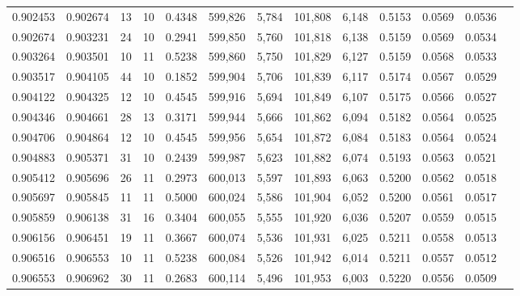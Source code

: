\begin{tabular}{rrrrrrrrrrrrr}
0.902453 & 0.902674 &    13 &  10 &                                     0.4348 & 599,826 &   5,784 & 101,808 &   6,148 & 0.5153 & 0.0569 & 0.0536 \\
0.902674 & 0.903231 &    24 &  10 &                                     0.2941 & 599,850 &   5,760 & 101,818 &   6,138 & 0.5159 & 0.0569 & 0.0534 \\
0.903264 & 0.903501 &    10 &  11 &                                     0.5238 & 599,860 &   5,750 & 101,829 &   6,127 & 0.5159 & 0.0568 & 0.0533 \\
0.903517 & 0.904105 &    44 &  10 &                                     0.1852 & 599,904 &   5,706 & 101,839 &   6,117 & 0.5174 & 0.0567 & 0.0529 \\
0.904122 & 0.904325 &    12 &  10 &                                     0.4545 & 599,916 &   5,694 & 101,849 &   6,107 & 0.5175 & 0.0566 & 0.0527 \\
0.904346 & 0.904661 &    28 &  13 &                                     0.3171 & 599,944 &   5,666 & 101,862 &   6,094 & 0.5182 & 0.0564 & 0.0525 \\
0.904706 & 0.904864 &    12 &  10 &                                     0.4545 & 599,956 &   5,654 & 101,872 &   6,084 & 0.5183 & 0.0564 & 0.0524 \\
0.904883 & 0.905371 &    31 &  10 &                                     0.2439 & 599,987 &   5,623 & 101,882 &   6,074 & 0.5193 & 0.0563 & 0.0521 \\
0.905412 & 0.905696 &    26 &  11 &                                     0.2973 & 600,013 &   5,597 & 101,893 &   6,063 & 0.5200 & 0.0562 & 0.0518 \\
0.905697 & 0.905845 &    11 &  11 &                                     0.5000 & 600,024 &   5,586 & 101,904 &   6,052 & 0.5200 & 0.0561 & 0.0517 \\
0.905859 & 0.906138 &    31 &  16 &                                     0.3404 & 600,055 &   5,555 & 101,920 &   6,036 & 0.5207 & 0.0559 & 0.0515 \\
0.906156 & 0.906451 &    19 &  11 &                                     0.3667 & 600,074 &   5,536 & 101,931 &   6,025 & 0.5211 & 0.0558 & 0.0513 \\
0.906516 & 0.906553 &    10 &  11 &                                     0.5238 & 600,084 &   5,526 & 101,942 &   6,014 & 0.5211 & 0.0557 & 0.0512 \\
0.906553 & 0.906962 &    30 &  11 &                                     0.2683 & 600,114 &   5,496 & 101,953 &   6,003 & 0.5220 & 0.0556 & 0.0509 \\

\end{tabular}

